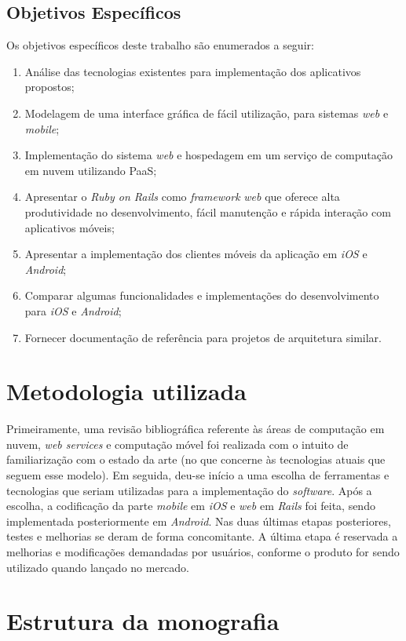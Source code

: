 \subsection{Objetivos Específicos}
 
Os objetivos específicos deste trabalho são enumerados a seguir:
\begin{enumerate}
\item Análise das tecnologias existentes para implementação dos aplicativos propostos;
\item Modelagem de uma interface gráfica de fácil utilização, para sistemas \emph{web} e \emph{mobile};
\item Implementação do sistema \emph{web} e hospedagem em um serviço de computação em nuvem utilizando \ac{PaaS};
\item Apresentar o \emph{Ruby on Rails} como \emph{framework} \emph{web} que oferece alta produtividade no desenvolvimento, fácil manutenção e rápida interação com aplicativos móveis;
\item Apresentar a implementação dos clientes móveis da aplicação em \emph{iOS} e \emph{Android};
\item Comparar algumas funcionalidades e implementações do desenvolvimento para \emph{iOS} e \emph{Android};
\item Fornecer documentação de referência para projetos de arquitetura similar.
 \end{enumerate}
\section{Metodologia utilizada}
 
        Primeiramente, uma revisão bibliográfica referente às áreas de computação em nuvem, \emph{web services} e computação móvel foi realizada com o intuito de familiarização com o estado da arte (no que concerne às tecnologias atuais que seguem esse modelo). Em seguida, deu-se início a uma escolha de ferramentas e tecnologias que seriam utilizadas para a implementação do \emph{software}.  Após a escolha, a codificação da parte \emph{mobile} em \emph{iOS} e \emph{web} em \emph{Rails}  foi feita, sendo implementada posteriormente em \emph{Android}. Nas duas últimas etapas posteriores, testes e melhorias se deram de forma concomitante.  A última etapa é reservada a melhorias e modificações demandadas por usuários, conforme o produto for sendo utilizado quando lançado no mercado.
 
\section{Estrutura da monografia }
 
